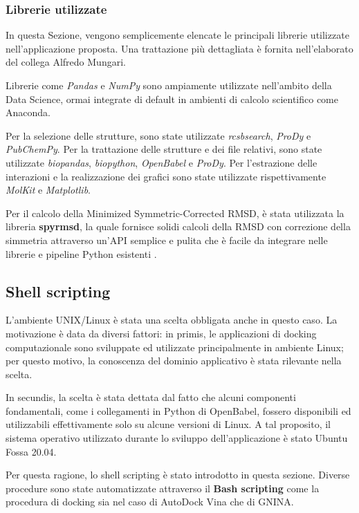 \subsubsection{Librerie utilizzate}
In questa Sezione, vengono semplicemente elencate le principali librerie utilizzate nell'applicazione proposta. Una trattazione più dettagliata è fornita nell'elaborato del collega Alfredo Mungari.

Librerie come \textit{Pandas} e \textit{NumPy} sono ampiamente utilizzate nell'ambito della Data Science, ormai integrate di default in ambienti di calcolo scientifico come Anaconda.

Per la selezione delle strutture, sono state utilizzate \textit{rcsbsearch}, \textit{ProDy} e \textit{PubChemPy}.
Per la trattazione delle strutture e dei file relativi, sono state utilizzate \textit{biopandas}, \textit{biopython}, \textit{OpenBabel} e \textit{ProDy}.
Per l'estrazione delle interazioni e la realizzazione dei grafici sono state utilizzate rispettivamente \textit{MolKit} e \textit{Matplotlib}.

Per il calcolo della Minimized Symmetric-Corrected RMSD, è stata utilizzata la libreria \textbf{spyrmsd}, la quale fornisce solidi calcoli della RMSD con correzione della simmetria attraverso un'API semplice e pulita che è facile da integrare nelle librerie e pipeline Python esistenti \cite{meli_spyrmsd_2020}.


\subsection{Shell scripting}
L'ambiente UNIX/Linux è stata una scelta obbligata anche in questo caso. La motivazione è data da diversi fattori: in primis, le applicazioni di docking computazionale sono sviluppate ed utilizzate principalmente in ambiente Linux; per questo motivo, la conoscenza del dominio applicativo è stata rilevante nella scelta. 

In secundis, la scelta è stata dettata dal fatto che alcuni componenti fondamentali, come i collegamenti in Python di OpenBabel, fossero disponibili ed utilizzabili effettivamente solo su alcune versioni di Linux. A tal proposito, il sistema operativo utilizzato 
durante lo sviluppo dell'applicazione è stato Ubuntu Fossa 20.04.

Per questa ragione, lo shell scripting è stato introdotto in questa sezione. Diverse procedure sono state automatizzate attraverso il \textbf{Bash scripting} come la procedura di docking sia nel caso di AutoDock Vina che di GNINA.


